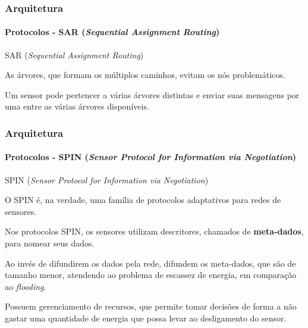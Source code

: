 \documentclass[notes]{beamer}
\begin{document}
\begin{frame}
\label{slide_54}
\frametitle{Arquitetura}
\framesubtitle{Protocolos - SAR (\textit{Sequential Assignment Routing})}

\begin{block}{SAR (\textit{Sequential Assignment Routing})}

As árvores, que formam os múltiplos caminhos, evitam os nós problemáticos.

\end{block} \pause

\begin{block}

Um sensor pode pertencer a várias árvores distintas e enviar suas mensagens por uma entre as várias árvores disponíveis.

\end{block}

\end{frame}

\begin{frame}
\label{slide_55}
\frametitle{Arquitetura}
\framesubtitle{Protocolos - SPIN (\textit{Sensor Protocol for Information via Negotiation})}

\begin{block}{SPIN (\textit{Sensor Protocol for Information via Negotiation})}

O SPIN é, na verdade, uma família de protocolos adaptativos para redes de sensores.

\end{block} \pause

\begin{block}

Nos protocolos SPIN, os sensores utilizam descritores, chamados de \textbf{meta-dados}, para nomear seus dados.

\end{block} \pause

\begin{block}

Ao invés de difundirem os dados pela rede, difundem os meta-dados, que são de tamanho menor, atendendo ao problema de escassez de energia, em comparação ao \textit{flooding}.

\end{block} \pause

\begin{block}

Possuem gerenciamento de recursos, que permite tomar decisões de forma a não gastar uma quantidade de energia que possa levar ao desligamento do sensor.

\end{block}

\end{frame}
\end{document}
